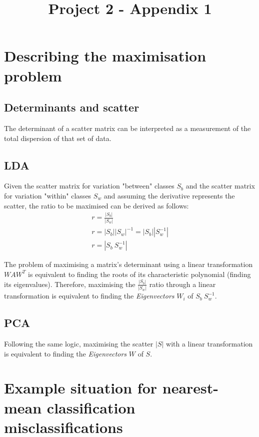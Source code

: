 \documentclass{bmvc2k}
\title{Project 2 - Appendix 1}
\begin{document}
\maketitle

\section{Describing the maximisation problem}
\subsection{Determinants and scatter}
The determinant of a scatter matrix can be interpreted as a measurement of the total dispersion of that set of data\cite{statanalysis}.
\subsection{LDA}
Given the scatter matrix for variation "between" classes $S_b$ and the scatter matrix for variation "within" classes $S_w$ and assuming the derivative represents the scatter, the ratio to be maximised can be derived as follows:
\begin{equation}
   \begin{split}
      r = \frac{|S_b|}{|S_w|}\\
      r = |S_b||S_w|^{-1} = |S_b||S_w^{-1}|\\
      r = |S_b\ S_w^{-1}|
   \end{split}
\end{equation}

The problem of maximising a matrix's determinant using a linear transformation $WAW^T$ is equivalent to finding the roots of its characteristic polynomial (finding its eigenvalues)\cite{detmax}. Therefore, maximising the $\frac{|S_b|}{|S_w|}$ ratio through a linear transformation is equivalent to finding the \textit{Eigenvectors} $W_i$ of $S_b\ S_w^{-1}$.

\subsection{PCA}
Following the same logic, maximising the scatter $|S|$ with a linear transformation is equivalent to finding the \textit{Eigenvectors} $W$ of $S$.

\section{Example situation for nearest-mean classification misclassifications}
\end{document}
